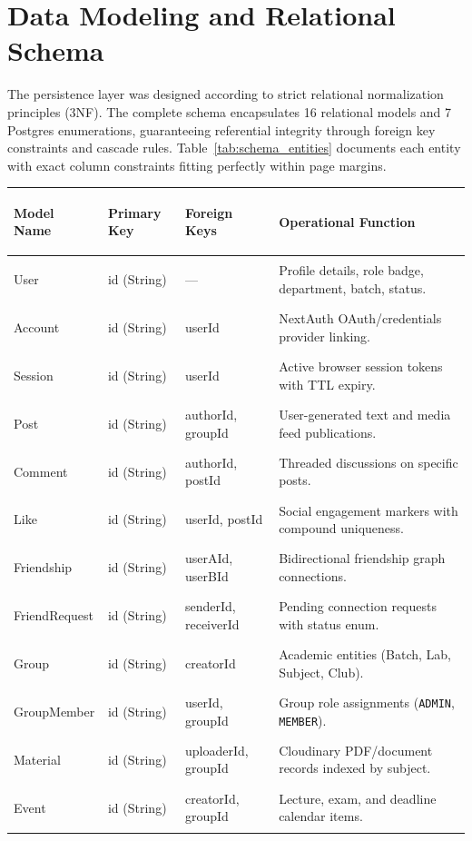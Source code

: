 \documentclass[12pt, a4paper, oneside]{report}
\begin{document}
\section{Data Modeling and Relational Schema}
The persistence layer was designed according to strict relational normalization principles (3NF). The complete schema encapsulates 16 relational models and 7 Postgres enumerations, guaranteeing referential integrity through foreign key constraints and cascade rules. Table~\ref{tab:schema_entities} documents each entity with exact column constraints fitting perfectly within page margins.

\begin{table}[H]
\centering
\small
\begin{tabularx}{\textwidth}{>{\bfseries\ttfamily\raggedright\arraybackslash}p{2.6cm} >{\ttfamily\raggedright\arraybackslash}p{2.0cm} >{\ttfamily\raggedright\arraybackslash}p{2.6cm} >{\raggedright\arraybackslash}X}
\toprule
\textbf{Model Name} & \textbf{Primary Key} & \textbf{Foreign Keys} & \textbf{Operational Function} \\
\midrule
User & id (String) & --- & Profile details, role badge, department, batch, status. \\
Account & id (String) & userId & NextAuth OAuth/credentials provider linking. \\
Session & id (String) & userId & Active browser session tokens with TTL expiry. \\
Post & id (String) & authorId, groupId & User-generated text and media feed publications. \\
Comment & id (String) & authorId, postId & Threaded discussions on specific posts. \\
Like & id (String) & userId, postId & Social engagement markers with compound uniqueness. \\
Friendship & id (String) & userAId, userBId & Bidirectional friendship graph connections. \\
FriendRequest & id (String) & senderId, receiverId & Pending connection requests with status enum. \\
Group & id (String) & creatorId & Academic entities (Batch, Lab, Subject, Club). \\
GroupMember & id (String) & userId, groupId & Group role assignments (\texttt{ADMIN}, \texttt{MEMBER}). \\
Material & id (String) & uploaderId, groupId & Cloudinary PDF/document records indexed by subject. \\
Event & id (String) & creatorId, groupId & Lecture, exam, and deadline calendar items. \\

\end{tabularx}
\end{table}
\end{document}
